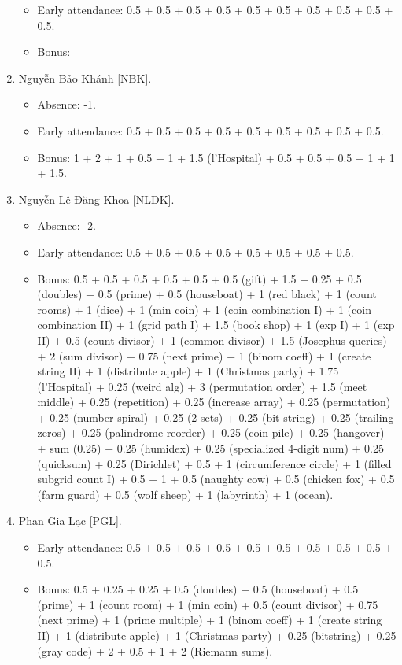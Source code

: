 \documentclass{article}
\begin{document}
\begin{enumerate}
\begin{itemize}
		\item Early attendance: 0.5 + 0.5 + 0.5 + 0.5 + 0.5 + 0.5 + 0.5 + 0.5 + 0.5 + 0.5.
		\item Bonus:
	\end{itemize}
	\item {\sc Nguyễn Bảo Khánh [NBK].}
	\begin{itemize}
        \item Absence: -1.
		\item Early attendance: 0.5 + 0.5 + 0.5 + 0.5 + 0.5 + 0.5 + 0.5 + 0.5 + 0.5.
		\item Bonus: 1 + 2 + 1 + 0.5 + 1 + 1.5 (l'Hospital) + 0.5 + 0.5 + 0.5 + 1 + 1 + 1.5.
	\end{itemize}
	\item {\sc Nguyễn Lê Đăng Khoa [NLDK].}
	\begin{itemize}
        \item Absence: -2.
		\item Early attendance: 0.5 + 0.5 + 0.5 + 0.5 + 0.5 + 0.5 + 0.5 + 0.5.
		\item Bonus: 0.5 + 0.5 + 0.5 + 0.5 + 0.5 + 0.5 (gift) + 1.5 + 0.25 + 0.5 (doubles) + 0.5 (prime) + 0.5 (houseboat) + 1 (red black) + 1 (count rooms) + 1 (dice) + 1 (min coin) + 1 (coin combination I) + 1 (coin combination II) + 1 (grid path I) + 1.5 (book shop) + 1 (exp I) + 1 (exp II) + 0.5 (count divisor) + 1 (common divisor) + 1.5 (Josephus queries) + 2 (sum divisor) + 0.75 (next prime) + 1 (binom coeff) + 1 (create string II) + 1 (distribute apple) + 1 (Christmas party) + 1.75 (l'Hospital) + 0.25 (weird alg) + 3 (permutation order) + 1.5 (meet middle) + 0.25 (repetition) + 0.25 (increase array) + 0.25 (permutation) + 0.25 (number spiral) + 0.25 (2 sets) + 0.25 (bit string) + 0.25 (trailing zeros) + 0.25 (palindrome reorder) + 0.25 (coin pile) + 0.25 (hangover) + sum (0.25) + 0.25 (humidex) + 0.25 (specialized 4-digit num) + 0.25 (quicksum) + 0.25 (Dirichlet) + 0.5 + 1 (circumference circle) + 1 (filled subgrid count I) + 0.5 + 1 + 0.5 (naughty cow) + 0.5 (chicken fox) + 0.5 (farm guard) + 0.5 (wolf sheep) + 1 (labyrinth) + 1 (ocean).
	\end{itemize}
	\item {\sc Phan Gia Lạc [PGL].}
	\begin{itemize}
		\item Early attendance: 0.5 + 0.5 + 0.5 + 0.5 + 0.5 + 0.5 + 0.5 + 0.5 + 0.5 + 0.5.
		\item Bonus: 0.5 + 0.25 + 0.25 + 0.5 (doubles) + 0.5 (houseboat) + 0.5 (prime) + 1 (count room) + 1 (min coin) + 0.5 (count divisor) + 0.75 (next prime) + 1 (prime multiple) + 1 (binom coeff) + 1 (create string II) + 1 (distribute apple) + 1 (Christmas party) + 0.25 (bitstring) + 0.25 (gray code) + 2 + 0.5 + 1 + 2 (Riemann sums).

\end{itemize}
\end{enumerate}
\end{document}
